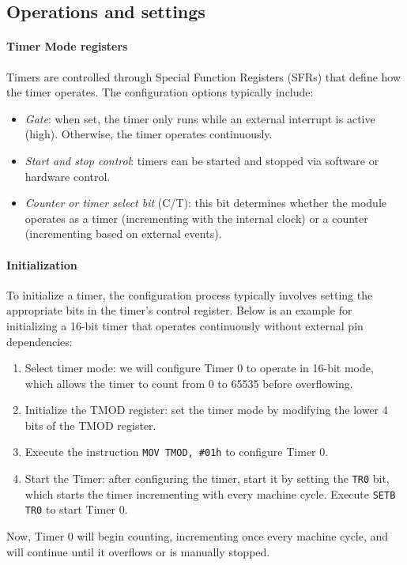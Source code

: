 \subsection{Operations and settings}
\paragraph*{Timer Mode registers}
Timers are controlled through Special Function Registers (SFRs) that define how the timer operates. 
The configuration options typically include:
\begin{itemize}
    \item \textit{Gate}: when set, the timer only runs while an external interrupt is active (high). 
        Otherwise, the timer operates continuously.
    \item \textit{Start and stop control}: timers can be started and stopped via software or hardware control. 
    \item \textit{Counter or timer select bit} (C/T): this bit determines whether the module operates as a timer (incrementing with the internal clock) or a counter (incrementing based on external events). 
\end{itemize}

\paragraph*{Initialization}
To initialize a timer, the configuration process typically involves setting the appropriate bits in the timer's control register. 
Below is an example for initializing a 16-bit timer that operates continuously without external pin dependencies:
\begin{enumerate}
    \item Select timer mode: we will configure Timer 0 to operate in 16-bit mode, which allows the timer to count from 0 to 65535 before overflowing.
    \item Initialize the TMOD register: set the timer mode by modifying the lower 4 bits of the TMOD register. 
    \item Execute the instruction \texttt{MOV TMOD, \#01h} to configure Timer 0.
    \item Start the Timer: after configuring the timer, start it by setting the \texttt{TR0} bit, which starts the timer incrementing with every machine cycle.
        Execute \texttt{SETB TR0} to start Timer 0.
\end{enumerate}
Now, Timer 0 will begin counting, incrementing once every machine cycle, and will continue until it overflows or is manually stopped.

